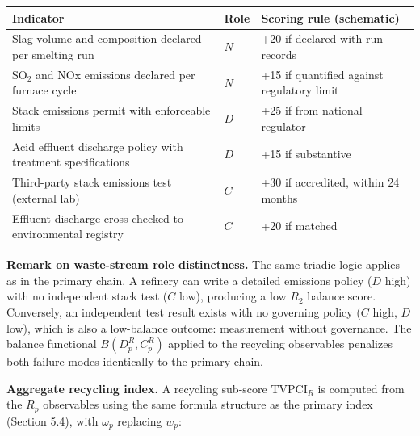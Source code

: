 \documentclass[12pt]{article}
\begin{document}
\begin{longtable}[]{@{}
  >{\raggedright\arraybackslash}p{}
  >{\raggedright\arraybackslash}p{}
  >{\raggedright\arraybackslash}p{}@{}}
\toprule\noalign{}
\begin{minipage}[b]{\linewidth}\raggedright
Indicator
\end{minipage} & \begin{minipage}[b]{\linewidth}\raggedright
Role
\end{minipage} & \begin{minipage}[b]{\linewidth}\raggedright
Scoring rule (schematic)
\end{minipage} \\
\midrule\noalign{}
\endhead
\bottomrule\noalign{}
\endlastfoot
Slag volume and composition declared per smelting run & \(N\) & +20 if
declared with run records \\
SO\(_2\) and NOx emissions declared per furnace cycle & \(N\) & +15 if
quantified against regulatory limit \\
Stack emissions permit with enforceable limits & \(D\) & +25 if from
national regulator \\
Acid effluent discharge policy with treatment specifications & \(D\) &
+15 if substantive \\
Third-party stack emissions test (external lab) & \(C\) & +30 if
accredited, within 24 months \\
Effluent discharge cross-checked to environmental registry & \(C\) & +20
if matched \\
\end{longtable}

\textbf{Remark on waste-stream role distinctness.} The same triadic
logic applies as in the primary chain. A refinery can write a detailed
emissions policy (\(D\) high) with no independent stack test (\(C\)
low), producing a low \(R_2\) balance score. Conversely, an independent
test result exists with no governing policy (\(C\) high, \(D\) low),
which is also a low-balance outcome: measurement without governance. The
balance functional \(B(D_p^R, C_p^R)\) applied to the recycling
observables penalizes both failure modes identically to the primary
chain.

\textbf{Aggregate recycling index.} A recycling sub-score
\(\mathrm{TVPCI}_R\) is computed from the \(R_p\) observables using the
same formula structure as the primary index (Section 5.4), with
\(\omega_p\) replacing \(w_p\):
\end{document}
